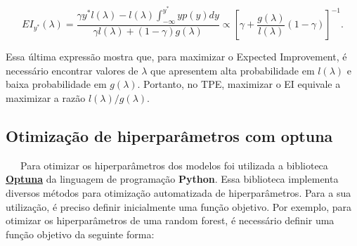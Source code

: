 \documentclass[
  12pt,
  a4paper,
]{scrreprt}
\begin{document}
\[
EI_{y^*}\left(\lambda\right) = \frac{\gamma y^* l\left(\lambda\right) - l\left(\lambda\right) \int_{-\infty}^{y^*} yp\left(y\right)dy}{\gamma l\left(\lambda\right) + \left(1 - \gamma\right)g\left(\lambda\right)} \propto \left[\gamma + \frac{g\left(\lambda\right)}{l\left(\lambda\right)} \left(1 - \gamma\right)\right]^{-1}\text{.}
\]

Essa última expressão mostra que, para maximizar o Expected Improvement,
é necessário encontrar valores de \(\lambda\) que apresentem alta
probabilidade em \(l\left(\lambda\right)\) e baixa probabilidade em
\(g\left(\lambda\right)\). Portanto, no TPE, maximizar o EI equivale a
maximizar a razão \(l\left(\lambda\right) / g\left(\lambda\right)\).

\subsection{Otimização de hiperparâmetros com
optuna}\label{otimizauxe7uxe3o-de-hiperparuxe2metros-com-optuna}

~~~Para otimizar os hiperparâmetros dos modelos foi utilizada a
biblioteca \href{https://optuna.org/}{\textbf{Optuna}} da linguagem de
programação \textbf{Python}. Essa biblioteca implementa diversos métodos
para otimização automatizada de hiperparâmetros. Para a sua utilização,
é preciso definir inicialmente uma função objetivo. Por exemplo, para
otimizar os hiperparâmetros de uma random forest, é necessário definir
uma função objetivo da seguinte forma:
\end{document}
